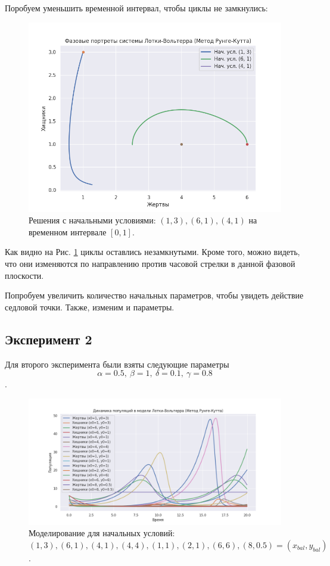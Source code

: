 Поробуем уменьшить временной интервал, чтобы циклы не замкнулись:
\begin{figure}[h]  %
	\centering
	\includegraphics[width=1\textwidth]{imgs/phase_1_1.png}  %
	\caption{Решения с начальными условиями: $(1,3), (6,1),(4,1)$ на временном интервале $[0,1]$.}  %
	\label{fig:phase_1_1}  %
\end{figure}

Как видно на Рис. \ref{fig:phase_1_1} циклы оставлись незамкнутыми. Кроме того, можно видеть, что они изменяются по направлению против часовой стрелки в данной фазовой плоскости.

Попробуем увеличить количество начальных параметров, чтобы увидеть действие седловой точки. Также, изменим и параметры.
\newpage
\subsection{Эксперимент 2}
Для второго эксперимента были взяты следующие параметры $$\alpha = 0.5, \ \beta = 1, \ \delta = 0.1, \ \gamma = 0.8$$.

\begin{figure}[h]  %
	\centering
	\includegraphics[width=1\textwidth]{imgs/pop_2.png}  %
	\caption{Моделирование для начальных условий: $(1, 3), (6, 1), (4,1), (4,4), (1,1), (2,1), (6,6), (8,0.5) = (x_{bal}, y_{bal})$.}  %
	\label{fig:pop_2}  %
\end{figure}

